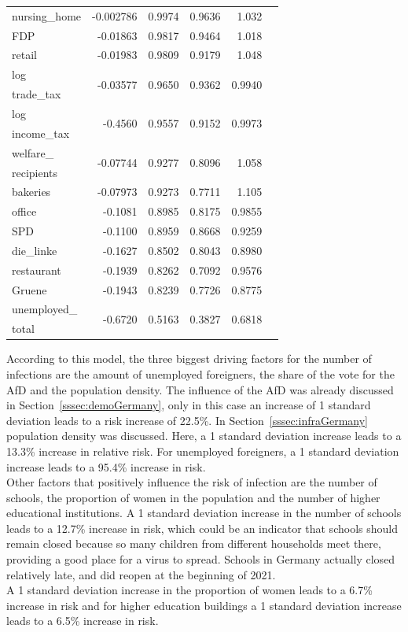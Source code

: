 \begin{table}[H]
\begin{tabular}{l r r r r c}
nursing\_home & -0.002786 & 0.9974 & 0.9636 & 1.032 \\ 
FDP & -0.01863 & 0.9817 & 0.9464 & 1.018 \\
retail & -0.01983 & 0.9809 & 0.9179 & 1.048 \\
log & \multirow{2}{*}{-0.03577} & \multirow{2}{*}{0.9650} & \multirow{2}{*}{0.9362} & \multirow{2}{*}{0.9940} \\
trade\_tax \\
log & \multirow{2}{*}{-0.4560} & \multirow{2}{*}{0.9557} & \multirow{2}{*}{0.9152} & \multirow{2}{*}{0.9973} \\
income\_tax \\
welfare\_ & \multirow{2}{*}{-0.07744} & \multirow{2}{*}{0.9277} & \multirow{2}{*}{0.8096} & \multirow{2}{*}{1.058} \\
recipients &  \\
bakeries & -0.07973 & 0.9273 & 0.7711 & 1.105 \\
office & -0.1081 & 0.8985 & 0.8175 & 0.9855 \\
SPD & -0.1100 & 0.8959 & 0.8668 & 0.9259 \\
die\_linke & -0.1627 & 0.8502 & 0.8043 & 0.8980 \\
restaurant & -0.1939 & 0.8262 & 0.7092 & 0.9576 \\
Gruene & -0.1943 & 0.8239 & 0.7726 & 0.8775 \\
unemployed\_ & \multirow{2}{*}{-0.6720} & \multirow{2}{*}{0.5163} & \multirow{2}{*}{0.3827} & \multirow{2}{*}{0.6818} \\
total & \\
\bottomrule
\end{tabular}
\end{table}
According to this model, the three biggest driving factors for the number of infections are the amount of unemployed foreigners, the share of the vote for the AfD and the population density. The influence of the AfD was already discussed in Section~\ref{sssec:demoGermany}, only in this case an increase of 1 standard deviation leads to a risk increase of 22.5\%. In Section~\ref{sssec:infraGermany} population density was discussed. Here, a 1 standard deviation increase leads to a 13.3\% increase in relative risk. For unemployed foreigners, a 1 standard deviation increase leads to a 95.4\% increase in risk. \\
Other factors that positively influence the risk of infection are the number of schools, the proportion of women in the population and the number of higher educational institutions. A 1 standard deviation increase in the number of schools leads to a 12.7\% increase in risk, which could be an indicator that schools should remain closed because so many children from different households meet there, providing a good place for a virus to spread. Schools in Germany actually closed relatively late, and did reopen at the beginning of 2021.\\
A 1 standard deviation increase in the proportion of women leads to a 6.7\% increase in risk and for higher education buildings a 1 standard deviation increase leads to a 6.5\% increase in risk. 
